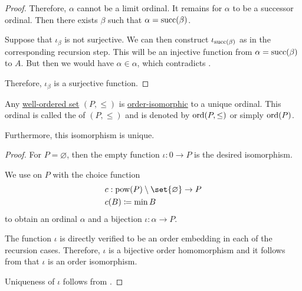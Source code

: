 \begin{proof}
  Therefore, \( \alpha \) cannot be a limit ordinal. It remains for \( \alpha \) to be a successor ordinal. Then there exists \( \beta \) such that \( \alpha = \operatorname{succ}(\beta) \).

  Suppose that \( \iota_\beta \) is not surjective. We can then construct \( \iota_{\operatorname{succ}(\beta)} \) as in the corresponding recursion step. This will be an injective function from \( \alpha = \operatorname{succ}(\beta) \) to \( A \). But then we would have \( \alpha \in \alpha \), which contradicts .

  Therefore, \( \iota_\beta \) is a surjective function.
\end{proof}

\begin{theorem}\label{thm:well_ordered_order_type_existence}
  Any \hyperref[def:well_ordered_set]{well-ordered set} \( (P, \leq) \) is \hyperref[def:order_homomorphism/isomorphism]{order-isomorphic} to a unique ordinal. This ordinal is called the  of \( (P, \leq) \) and is denoted by \( \operatorname{ord}(P, \leq) \) or simply \( \operatorname{ord}(P) \).

  Furthermore, this isomorphism is unique.
\end{theorem}
\begin{proof}
  For \( P = \varnothing \), then the empty function \( \iota: 0 \to P \) is the desired isomorphism.

  We use  on \( P \) with the choice function
  \begin{equation*}
    \begin{aligned}
      &c: \pow(P) \setminus \set{ \varnothing } \to P \\
      &c(B) \coloneqq \min B
    \end{aligned}
  \end{equation*}
  to obtain an ordinal \( \alpha \) and a bijection \( \iota: \alpha \to P \).

  The function \( \iota \) is directly verified to be an order embedding in each of the recursion cases. Therefore, \( \iota \) is a bijective order homomorphism and it follows from  that \( \iota \) is an order isomorphism.

  Uniqueness of \( \iota \) follows from .
\end{proof}

